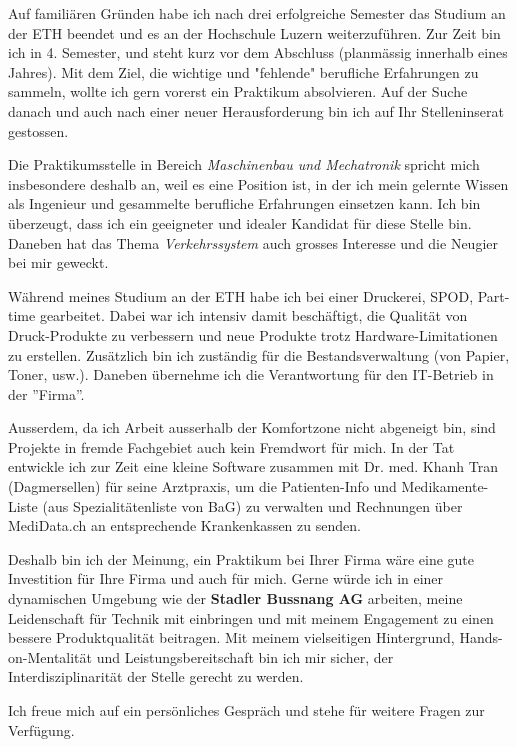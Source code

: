 \documentclass[11pt, a4paper]{awesome-cv}
\begin{document}
\makecvheader

\makelettertitle

\begin{cvletter}

Auf familiären Gründen habe ich nach drei erfolgreiche Semester das Studium an der ETH beendet und es an der Hochschule Luzern weiterzuführen. Zur Zeit bin ich in 4. Semester, und steht kurz vor dem Abschluss (planmässig innerhalb eines Jahres). Mit dem Ziel, die wichtige und "fehlende" berufliche Erfahrungen zu sammeln, wollte ich gern vorerst ein Praktikum absolvieren. Auf der Suche danach und auch nach einer neuer Herausforderung bin ich auf Ihr Stelleninserat gestossen.

Die Praktikumsstelle in Bereich \textit{Maschinenbau und Mechatronik} spricht mich insbesondere deshalb an, weil es eine Position ist, in der ich mein gelernte Wissen als Ingenieur und gesammelte berufliche Erfahrungen einsetzen kann. Ich bin überzeugt, dass ich ein geeigneter und idealer Kandidat für diese Stelle bin. Daneben hat das Thema \textit{Verkehrssystem} auch grosses Interesse und die Neugier bei mir geweckt.

Während meines Studium an der ETH habe ich bei einer Druckerei, SPOD, Part-time gearbeitet. Dabei war ich intensiv damit beschäftigt, die Qualität von Druck-Produkte zu verbessern und neue Produkte trotz Hardware-Limitationen zu erstellen. Zusätzlich bin ich zuständig für die Bestandsverwaltung (von Papier, Toner, usw.). Daneben übernehme ich die Verantwortung für den IT-Betrieb in der ”Firma”. 
 
Ausserdem, da ich Arbeit ausserhalb der Komfortzone nicht abgeneigt bin, sind Projekte in fremde Fachgebiet auch kein Fremdwort für mich. In der Tat entwickle ich zur Zeit eine kleine Software zusammen mit Dr. med. Khanh Tran (Dagmersellen) für seine Arztpraxis, um die Patienten-Info und Medikamente-Liste (aus Spezialitätenliste von BaG) zu verwalten und Rechnungen über MediData.ch an entsprechende Krankenkassen zu senden. 

Deshalb bin ich der Meinung, ein Praktikum bei Ihrer Firma wäre eine gute Investition für Ihre Firma und auch für mich. Gerne würde ich in einer dynamischen Umgebung wie der \textbf{Stadler Bussnang AG} arbeiten, meine Leidenschaft für Technik mit einbringen und mit meinem Engagement zu einen bessere Produktqualität beitragen. Mit meinem vielseitigen Hintergrund, Hands-on-Mentalität und Leistungsbereitschaft bin ich mir sicher, der Interdisziplinarität der Stelle gerecht zu werden.

Ich freue mich auf ein persönliches Gespräch und stehe für weitere Fragen zur Verfügung.

\end{cvletter}

\makeletterclosing
\end{document}
